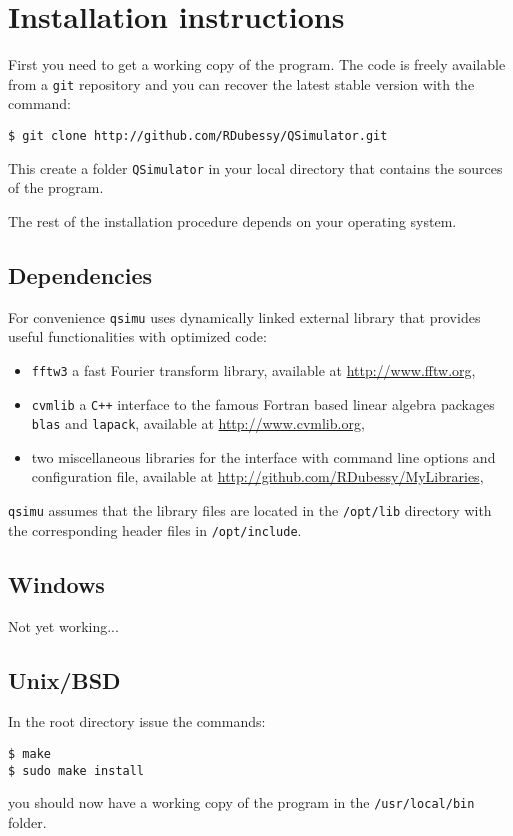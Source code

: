 \documentclass[12pt,a4paper]{report}
\newcommand{\qsimu}{\texttt{qsimu}{} }
\begin{document}
\section{Installation instructions}
First you need to get a working copy of the program.
The code is freely available from a \texttt{git} repository and you can recover the latest stable version with the command:
\begin{verbatim}
$ git clone http://github.com/RDubessy/QSimulator.git
\end{verbatim}
This create a folder \texttt{QSimulator} in your local directory that contains the sources of the program.

The rest of the installation procedure depends on your operating system.

\subsection{Dependencies}
For convenience \qsimu uses dynamically linked external library that provides useful functionalities with optimized code:
\begin{itemize}
\item \texttt{fftw3} a fast Fourier transform library, available at \url{http://www.fftw.org},
\item \texttt{cvmlib} a \texttt{C++} interface to the famous Fortran based linear algebra packages \texttt{blas} and \texttt{lapack}, available at \url{http://www.cvmlib.org},
\item two miscellaneous libraries for the interface with command line options and configuration file, available at \url{http://github.com/RDubessy/MyLibraries},
\end{itemize}
\qsimu assumes that the library files are located in the \texttt{/opt/lib} directory with the corresponding header files in \texttt{/opt/include}.

\subsection{Windows}
Not yet working...

\subsection{Unix/BSD}
In the root directory issue the commands:
\begin{verbatim}
$ make
$ sudo make install
\end{verbatim}
you should now have a working copy of the program in the \texttt{/usr/local/bin} folder.
\end{document}
